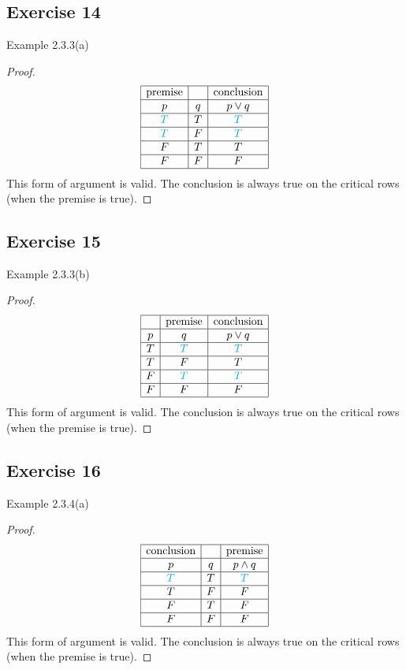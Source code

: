 \documentclass[14pt]{extarticle}
\begin{document}
\subsection{Exercise 14} 
Example 2.3.3(a)

\begin{proof} 
$$ 
\begin{array}{|c|c|c|} 
\hline 
\text{premise} & & \text{conclusion} \\ 
\hline 
p & q & p \vee q \\ 
\hline 
\color{cyan} T & T & \color{cyan} T \\ 
\hline 
\color{cyan} T & F & \color{cyan} T \\ 
\hline 
F & T & T \\ 
\hline 
F & F & F \\ 
\hline 
\end{array} 
$$ 
This form of argument is valid. The conclusion is always true on the critical rows (when the premise is true).
\end{proof}

\subsection{Exercise 15} 
Example 2.3.3(b)

\begin{proof} 
$$ 
\begin{array}{|c|c|c|} 
\hline 
& \text{premise} & \text{conclusion} \\ 
\hline 
p & q & p \vee q \\ 
\hline 
T & \color{cyan} T & \color{cyan} T \\ 
\hline 
T & F & T \\ 
\hline 
F & \color{cyan} T & \color{cyan} T \\ 
\hline 
F & F & F \\ 
\hline 
\end{array} 
$$ 
This form of argument is valid. The conclusion is always true on the critical rows (when the premise is true).
\end{proof}

\subsection{Exercise 16} 
Example 2.3.4(a)

\begin{proof} 
$$ 
\begin{array}{|c|c|c|} 
\hline 
\text{conclusion} & & \text{premise} \\ 
\hline 
p & q & p \wedge q \\ 
\hline 
\color{cyan} T & T & \color{cyan} T \\ 
\hline 
T & F & F \\ 
\hline 
F & T & F \\ 
\hline 
F & F & F \\
\hline 
\end{array} 
$$ 
This form of argument is valid. The conclusion is always true on the critical rows (when the premise is true). 
\end{proof}
\end{document}
